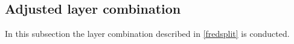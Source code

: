 \subsection{Adjusted layer combination}
In this subsection the layer combination described in \autoref{fredsplit} is conducted.
